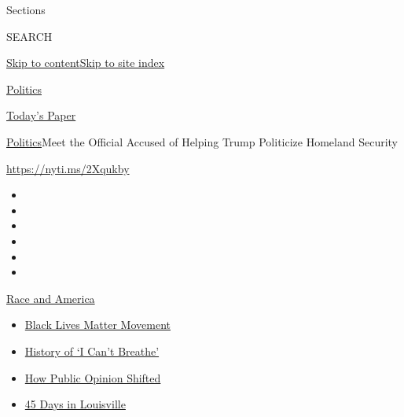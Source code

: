 Sections

SEARCH

\protect\hyperlink{site-content}{Skip to
content}\protect\hyperlink{site-index}{Skip to site index}

\href{https://www.nytimes3xbfgragh.onion/section/politics}{Politics}

\href{https://myaccount.nytimes3xbfgragh.onion/auth/login?response_type=cookie\&client_id=vi}{}

\href{https://www.nytimes3xbfgragh.onion/section/todayspaper}{Today's
Paper}

\href{/section/politics}{Politics}\textbar{}Meet the Official Accused of
Helping Trump Politicize Homeland Security

\url{https://nyti.ms/2Xqukby}

\begin{itemize}
\item
\item
\item
\item
\item
\item
\end{itemize}

\href{https://www.nytimes3xbfgragh.onion/news-event/george-floyd-protests-minneapolis-new-york-los-angeles?action=click\&pgtype=Article\&state=default\&region=TOP_BANNER\&context=storylines_menu}{Race
and America}

\begin{itemize}
\tightlist
\item
  \href{https://www.nytimes3xbfgragh.onion/interactive/2020/07/03/us/george-floyd-protests-crowd-size.html?action=click\&pgtype=Article\&state=default\&region=TOP_BANNER\&context=storylines_menu}{Black
  Lives Matter Movement}
\item
  \href{https://www.nytimes3xbfgragh.onion/interactive/2020/06/28/us/i-cant-breathe-police-arrest.html?action=click\&pgtype=Article\&state=default\&region=TOP_BANNER\&context=storylines_menu}{History
  of `I Can't Breathe'}
\item
  \href{https://www.nytimes3xbfgragh.onion/interactive/2020/06/10/upshot/black-lives-matter-attitudes.html?action=click\&pgtype=Article\&state=default\&region=TOP_BANNER\&context=storylines_menu}{How
  Public Opinion Shifted}
\item
  \href{https://www.nytimes3xbfgragh.onion/interactive/2020/07/16/us/black-lives-matter-protests-louisville-breonna-taylor.html?action=click\&pgtype=Article\&state=default\&region=TOP_BANNER\&context=storylines_menu}{45
  Days in Louisville}
\end{itemize}

